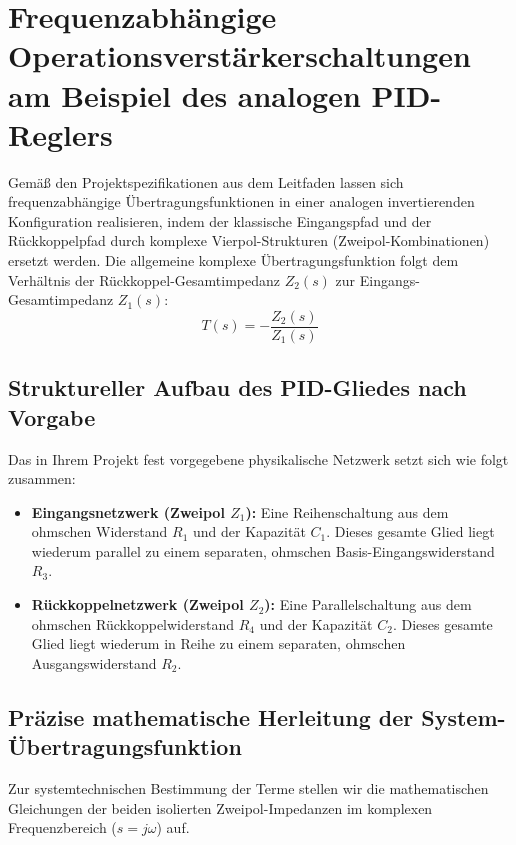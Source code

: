 \documentclass[11pt,a4paper]{article}
\begin{document}
\section{Frequenzabhängige Operationsverstärkerschaltungen am Beispiel des analogen PID-Reglers}

Gemäß den Projektspezifikationen aus dem Leitfaden lassen sich frequenzabhängige Übertragungsfunktionen in einer analogen invertierenden Konfiguration realisieren, indem der klassische Eingangspfad und der Rückkoppelpfad durch komplexe Vierpol-Strukturen (Zweipol-Kombinationen) ersetzt werden. Die allgemeine komplexe Übertragungsfunktion folgt dem Verhältnis der Rückkoppel-Gesamtimpedanz $Z_2(s)$ zur Eingangs-Gesamtimpedanz $Z_1(s)$:
\begin{equation}
T(s) = -\frac{Z_2(s)}{Z_1(s)}
\end{equation}

\subsection{Struktureller Aufbau des PID-Gliedes nach Vorgabe}
Das in Ihrem Projekt fest vorgegebene physikalische Netzwerk setzt sich wie folgt zusammen:
\begin{itemize}
    \item \textbf{Eingangsnetzwerk (Zweipol $Z_1$):} Eine Reihenschaltung aus dem ohmschen Widerstand $R_1$ und der Kapazität $C_1$. Dieses gesamte Glied liegt wiederum parallel zu einem separaten, ohmschen Basis-Eingangswiderstand $R_3$.
    \item \textbf{Rückkoppelnetzwerk (Zweipol $Z_2$):} Eine Parallelschaltung aus dem ohmschen Rückkoppelwiderstand $R_4$ und der Kapazität $C_2$. Dieses gesamte Glied liegt wiederum in Reihe zu einem separaten, ohmschen Ausgangswiderstand $R_2$.
\end{itemize}

\subsection{Präzise mathematische Herleitung der System-Übertragungsfunktion}
Zur systemtechnischen Bestimmung der Terme stellen wir die mathematischen Gleichungen der beiden isolierten Zweipol-Impedanzen im komplexen Frequenzbereich ($s = j\omega$) auf.
\end{document}
